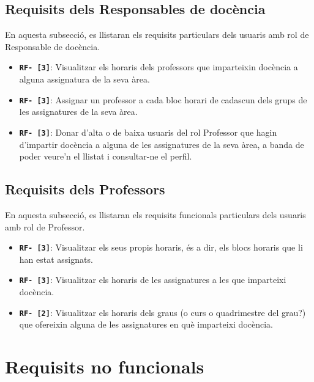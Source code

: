 \documentclass[a4paper,12pt]{ThesisStyle}
\begin{document}
\subsection{Requisits dels Responsables de docència} %
\label{subsec:requisits_responsables_docencia}

En aquesta subsecció, es llistaran els requisits particulars dels usuaris amb rol de Responsable de docència.

\begin{itemize} %
  \item \texttt{\textbf{RF- [3]}}: Visualitzar els horaris dels professors que imparteixin docència a alguna assignatura de la seva àrea.
  \item \texttt{\textbf{RF- [3]}}: Assignar un professor a cada bloc horari de cadascun dels grups de les assignatures de la seva àrea.
  \item \texttt{\textbf{RF- [3]}}: Donar d'alta o de baixa usuaris del rol Professor que hagin d'impartir docència a alguna de les assignatures de la seva àrea, a banda de poder veure'n el llistat i consultar-ne el perfil.
\end{itemize}

\subsection{Requisits dels Professors}
\label{subsec:requisits_professors}

En aquesta subsecció, es llistaran els requisits funcionals particulars dels usuaris amb rol de Professor.

\begin{itemize} %
  \item \texttt{\textbf{RF- [3]}}: Visualitzar els seus propis horaris, és a dir, els blocs horaris que li han estat assignats.
  \item \texttt{\textbf{RF- [3]}}: Visualitzar els horaris de les assignatures a les que imparteixi docència.
  \item \texttt{\textbf{RF- [2]}}: Visualitzar els horaris dels graus (o curs o quadrimestre del grau?) que ofereixin alguna de les assignatures en què imparteixi docència.
\end{itemize}

\section{Requisits no funcionals}
\label{sec:requisits_no_funcionals}
\end{document}

